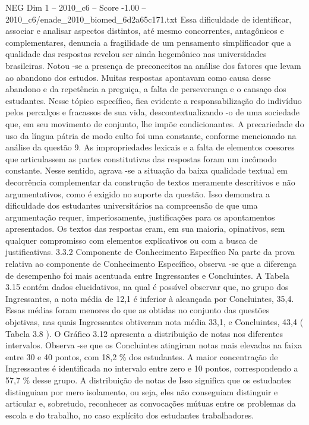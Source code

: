\begin{textsample}{NEG Dim 1 – 2010\_c6 – Score -1.00 – 2010\_c6/enade\_2010\_biomed\_6d2a65c171.txt}
Essa dificuldade de identificar, associar e analisar aspectos distintos, até mesmo concorrentes, antagônicos e complementares, denuncia a fragilidade de um pensamento simplificador que a qualidade das respostas revelou ser ainda hegemônico nas universidades brasileiras.
Notou -se a presença de preconceitos na análise dos fatores que levam ao abandono dos estudos.
Muitas respostas apontavam como causa desse abandono e da repetência a preguiça, a falta de perseverança e o cansaço dos estudantes.
Nesse tópico específico, fica evidente a responsabilização do indivíduo pelos percalços e fracassos de sua vida, descontextualizando -o de uma sociedade que, em seu movimento de conjunto, lhe impõe condicionantes.
A precariedade do uso da língua pátria de modo culto foi uma constante, conforme mencionado na análise da questão 9.
As impropriedades lexicais e a falta de elementos coesores que articulassem as partes constitutivas das respostas foram um incômodo constante.
Nesse sentido, agrava -se a situação da baixa qualidade textual em decorrência complementar da construção de textos meramente descritivos e não argumentativos, como é exigido no suporte da questão.
Isso demonstra a dificuldade dos estudantes universitários na compreensão de que uma argumentação requer, imperiosamente, justificações para os apontamentos apresentados.
Os textos das respostas eram, em sua maioria, opinativos, sem qualquer compromisso com elementos explicativos ou com a busca de justificativas. 3.3.2 Componente de Conhecimento Específico Na parte da prova relativa ao componente de Conhecimento Específico, observa -se que a diferença de desempenho foi mais acentuada entre Ingressantes e Concluintes.
A Tabela 3.15 contém dados elucidativos, na qual é possível observar que, no grupo dos Ingressantes, a nota média de 12,1 é inferior à alcançada por Concluintes, 35,4.
Essas médias foram menores do que as obtidas no conjunto das questões objetivas, nas quais Ingressantes obtiveram nota média 33,1, e Concluintes, 43,4 ( Tabela 3.8 ).
O Gráfico 3.12 apresenta a distribuição de notas nos diferentes intervalos.
Observa -se que os Concluintes atingiram notas mais elevadas na faixa entre 30 e 40 pontos, com 18,2 \% dos estudantes.
A maior concentração de Ingressantes é identificada no intervalo entre zero e 10 pontos, correspondendo a 57,7 \% desse grupo.
A distribuição de notas de Isso significa que os estudantes distinguiam por mero isolamento, ou seja, eles não conseguiam distinguir e articular e, sobretudo, reconhecer as convocações mútuas entre os problemas da escola e do trabalho, no caso explícito dos estudantes trabalhadores.

\end{textsample}
